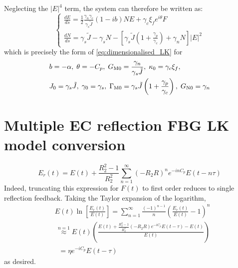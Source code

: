 %
Neglecting the $|E|^{4}$ term, the system can therefore be written as:
%
\begin{equation*}
\left\{\begin{array}{l}
\displaystyle \frac{d E}{d s}=\frac{1}{2} \frac{\gamma_{n}\gamma_c}{\gamma_{s} \tilde{J}}(1-ib) N E+\gamma_c\xi_{f} e^{i\theta} F \\ 
\displaystyle \frac{d N}{d s}=\gamma_{s} \tilde{J}-\gamma_{s} N-\left[\gamma_{s} \tilde{J}\left(1+\frac{\gamma_{p}}{\gamma_{c}}\right)+\gamma_{n} N\right]|E|^{2}\end{array}\right.
\end{equation*}
%
which is precisely the form of \eqref{eq:dimensionalised_LK} for
%
$$
\begin{aligned}
& b = -\alpha, \; \theta=-C_{p}, \; G_\text{M0}=\frac{\gamma_{n}}{\gamma_{s} \tilde{J}}, \; \kappa_{0}=\gamma_{c} \xi_{f}, \\
& J_{0}=\gamma_{s} \tilde{J}, \; \gamma_{0}=\gamma_{s}, \; \Gamma_\text{M0}=\gamma_{s} \tilde{J}\left(1+\frac{\gamma_{p}}{\gamma_{c}}\right), \; G_\text{N0}=\gamma_{n}
\end{aligned}
$$
%
%
\section{Multiple EC reflection FBG LK model conversion}
\label{app:EC_multiple}
%
\begin{equation*}
    E_r(t) = E(t) + \frac{R_2^2 - 1}{R_2^2} \sum_{n=1}^\infty (-R_2 R)^n e^{-i n C_p} E(t-n \tau)
\end{equation*}
%
Indeed, truncating this expression for $F(t)$ to first order reduces to single reflection feedback. Taking the Taylor expansion of the logarithm,
%
\begin{equation*}
    \begin{aligned}
        &E(t) \ln{\left[ \frac{E_r(t)}{E(t)} \right]} = \sum_{n=1}^\infty \frac{(-1)^{n-1}}{n}\left( \frac{E_r(t)}{E(t)} - 1\right)^n \\
        &\,\overset{n=1}{\approx} E(t)\left( \frac{E(t) + \frac{R_2^2 - 1}{R_2^2}(-R_2 R)e^{-i C_p} E(t - \tau) - E(t)}{E(t)} \right)\\
        &\;\;= \eta e^{-i C_p} E(t - \tau)
    \end{aligned}   
\end{equation*}
%
as desired.


